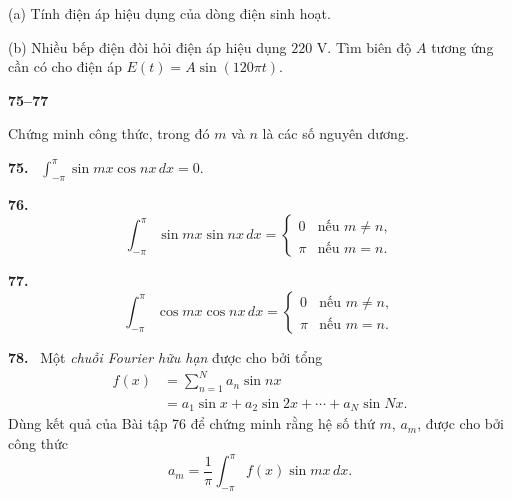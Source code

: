 \documentclass[12pt,a4paper]{article}
\newcommand{\bt}[1]{\par\smallskip\Needspace{5\baselineskip}\noindent\textbf{#1.}\ }
\newcommand{\group}[1]{\par\Needspace{11\baselineskip}\medskip\noindent\textbf{#1}\par\nopagebreak[4]}
\begin{document}
(a) Tính điện áp hiệu dụng của dòng điện sinh hoạt.

(b) Nhiều bếp điện đòi hỏi điện áp hiệu dụng $220$ V. Tìm biên độ $A$ tương ứng cần có cho điện áp $E(t)=A\sin(120\pi t)$.

\group{75–77} Chứng minh công thức, trong đó $m$ và $n$ là các số nguyên dương.
\bt{75} $\displaystyle\int_{-\pi}^{\pi}\sin mx\cos nx\,dx=0$.
\bt{76}
\[\int_{-\pi}^{\pi}\sin mx\sin nx\,dx=\begin{cases}0&\text{nếu }m\ne n,\\\pi&\text{nếu }m=n.\end{cases}\]
\bt{77}
\[\int_{-\pi}^{\pi}\cos mx\cos nx\,dx=\begin{cases}0&\text{nếu }m\ne n,\\\pi&\text{nếu }m=n.\end{cases}\]

\bt{78} Một \textit{chuỗi Fourier hữu hạn} được cho bởi tổng
\begin{align*}
f(x)&=\sum_{n=1}^N a_n\sin nx\\
&=a_1\sin x+a_2\sin2x+\cdots+a_N\sin Nx.
\end{align*}
Dùng kết quả của Bài tập 76 để chứng minh rằng hệ số thứ $m$, $a_m$, được cho bởi công thức
\[a_m=\frac1\pi\int_{-\pi}^{\pi}f(x)\sin mx\,dx.\]
\end{document}
